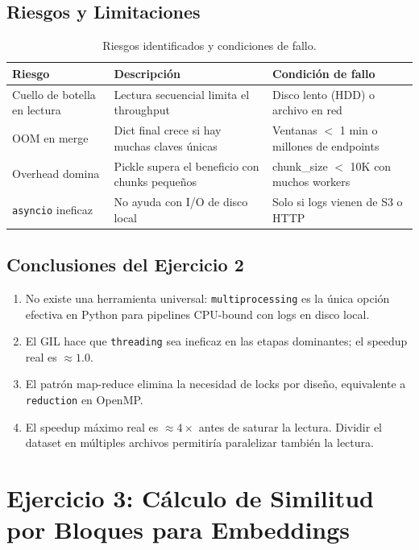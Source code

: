 \documentclass[10pt,a4paper]{article}
\begin{document}
\subsection{Riesgos y Limitaciones}

\begin{table}[H]
\centering
\begin{tabular}{p{3cm}p{5cm}p{5cm}}
\toprule
\textbf{Riesgo} & \textbf{Descripci\'on} & \textbf{Condici\'on de fallo} \\
\midrule
Cuello de botella en lectura & Lectura secuencial limita el throughput & Disco lento (HDD) o archivo en red \\
OOM en merge & Dict final crece si hay muchas claves \'unicas & Ventanas $<$ 1 min o millones de endpoints \\
Overhead domina & Pickle supera el beneficio con chunks peque\~nos & chunk\_size $<$ 10K con muchos workers \\
\texttt{asyncio} ineficaz & No ayuda con I/O de disco local & Solo si logs vienen de S3 o HTTP \\
\bottomrule
\end{tabular}
\caption{Riesgos identificados y condiciones de fallo.}
\end{table}

\subsection{Conclusiones del Ejercicio 2}

\begin{enumerate}
    \item No existe una herramienta universal: \texttt{multiprocessing} es la
        \'unica opci\'on efectiva en Python para pipelines CPU-bound con logs
        en disco local.
    \item El GIL hace que \texttt{threading} sea ineficaz en las etapas
        dominantes; el speedup real es $\approx 1.0$.
    \item El patr\'on map-reduce elimina la necesidad de locks por dise\~no,
        equivalente a \texttt{reduction} en OpenMP.
    \item El speedup m\'aximo real es $\approx 4\times$ antes de saturar la
        lectura. Dividir el dataset en m\'ultiples archivos permitir\'ia
        paralelizar tambi\'en la lectura.
\end{enumerate}

\section{Ejercicio 3: C\'alculo de Similitud por Bloques para Embeddings}
\end{document}
